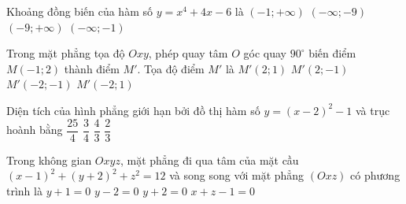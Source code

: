 \begin{ex}%
    Khoảng đồng biến của hàm số $y=x^4+4x-6$ là
    \choice
    {\True $\left(-1;+\infty \right)$}
    {$\left(-\infty;-9\right)$}
    {$\left(-9;+\infty \right)$}
    {$\left(-\infty;-1\right)$}
\end{ex}

\begin{ex}%
    Trong mặt phẳng tọa độ $Oxy$, phép quay tâm $O$ góc quay $90^{\circ}$ biến điểm $M\left(-1;2\right)$ thành điểm $M'$. Tọa độ điểm $M'$ là
    \choice
    {$M'\left(2;1\right)$}
    {$M'\left(2;-1\right)$}
    {\True $M'\left(-2;-1\right)$}
    {$M'\left(-2;1\right)$}
\end{ex}

\begin{ex}%
    Diện tích của hình phẳng giới hạn bởi đồ thị hàm số $y=(x-2)^2-1$ và trục hoành bằng
    \choice
    {$\dfrac{25}{4}$}
    {$\dfrac{3}{4}$}
    {\True $\dfrac{4}{3}$}
    {$\dfrac{2}{3}$}
\end{ex}

\begin{ex}%
    Trong không gian $Oxyz$, mặt phẳng đi qua tâm của mặt cầu $(x-1)^2+(y+2)^2+z^2=12$ và song song với mặt phẳng $(Ox z)$ có phương trình là
    \choice
    {$y+1=0$}
    {$y-2=0$}
    {\True $y+2=0$}
    {$x+z-1=0$}
\end{ex}


